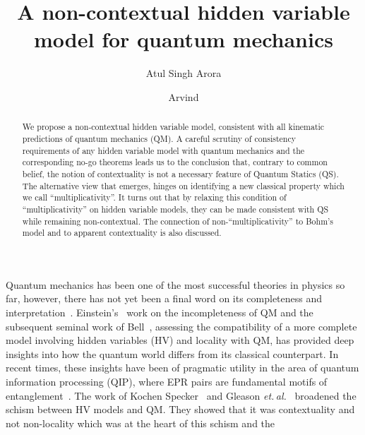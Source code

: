 \documentclass[british,aps,prl,superscriptaddress,nofootinbib,times,reprint]{revtex4-1}
\theoremstyle{plain}
\theoremstyle{plain}
\theoremstyle{definition}
\theoremstyle{remark}
\theoremstyle{remark}
\theoremstyle{remark}
\theoremstyle{plain}
\theoremstyle{plain}
\theoremstyle{plain}
\theoremstyle{definition}
\theoremstyle{definition}
\begin{document}
\title{A non-contextual hidden variable model for quantum mechanics}
\author{Atul Singh Arora}
\author{Arvind}
\begin{abstract}
We propose a non-contextual hidden variable model,
consistent with all kinematic
predictions of quantum
mechanics (QM).  A careful scrutiny of consistency
requirements of any hidden variable model with
quantum mechanics and the corresponding no-go
theorems leads us to the conclusion that,
contrary to common belief,  the notion of
contextuality is not a necessary feature of Quantum Statics (QS).
The alternative view that emerges, hinges on
identifying a new classical property which we call
``multiplicativity''.  It turns out that by
relaxing this condition of ``multiplicativity'' on
hidden variable models, they can be made
consistent with QS  while remaining
non-contextual.  The connection of
non-``multiplicativity'' to Bohm's model and to
apparent contextuality is also discussed.
\end{abstract}
\pacs{}
\maketitle
Quantum mechanics has been one of the most
successful theories in physics so far, however,
there has not yet been a final word on its
completeness and
interpretation~\cite{BellSpkblUnspkbl}.
Einstein's~\cite{EinsteinEPR} work on the
incompleteness of QM and the subsequent seminal
work of Bell~\cite{BellSpkblUnspkbl}, assessing
the compatibility of a more complete model
involving hidden variables (HV) and locality with
QM, has provided deep insights into  how the
quantum world differs from its classical
counterpart.  In recent times, these insights have
been of pragmatic utility in the area of quantum
information processing (QIP), where EPR pairs are
fundamental motifs of
entanglement~\cite{Ekert,PironioRndmnssCrtfcn,NielsenChuang}.
The work of  Kochen Specker~\cite{KochenSpecker}
and Gleason {\it
et.\,al.}~\cite{Gleason,Peres,Mermin} broadened
the schism between  HV models and QM.  They showed
that it was contextuality and not non-locality
which was at the heart of this schism and the
\end{document}
